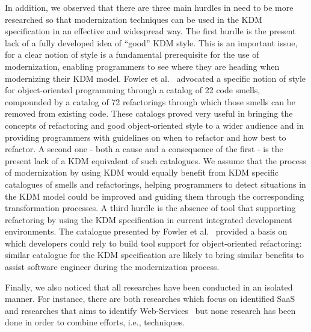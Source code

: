 In addition, we observed that there are three main hurdles in need to be more researched so that modernization techniques can be used in the KDM specification in an effective and widespread way. The first hurdle is the present lack of a fully developed idea of ``good'' KDM style. This is an important issue, for a clear notion of style is a fundamental prerequisite for the use of modernization, enabling programmers to see where they are heading when modernizing their KDM model. Fowler et al.~\cite{refactImpro} advocated a specific notion of style for object-oriented programming through a catalog of 22 code smells, compounded by a catalog of 72 refactorings through which those smells can be removed from existing code. These catalogs proved very useful in bringing the concepts of refactoring and good object-oriented style to a wider audience and in providing programmers with guidelines on when to refactor and how best to refactor. A second one - both a cause and a consequence of the first - is the present lack of a KDM equivalent of such catalogues. We assume that the process of modernization by using KDM would equally benefit from KDM specific catalogues of smells and refactorings, helping programmers to detect situations in the KDM model could be improved and guiding them through the corresponding transformation processes. A third hurdle is the absence of tool that supporting refactoring by using the KDM specification in current integrated development environments. The catalogue presented by Fowler et al.~\cite{refactImpro} provided a basis on which developers could rely to build tool support for object-oriented refactoring: similar catalogue for the KDM specification are likely to bring similar benefits to assist software engineer during the modernization process.

Finally, we also noticed that all researches have been conducted in an isolated manner. For instance, there are both researches which focus on identified SaaS~\cite{5741334, SMR:SMR582} and researches that aims to identify Web-Services~\cite{delCastillo:2009:PRP:1529282.1529753, ICEISPerez:CastilloGCP12} but none research has been done in order to combine efforts, i.e., techniques. 